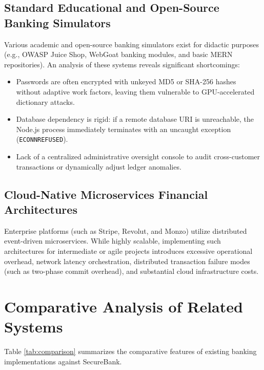 \subsection{Standard Educational and Open-Source Banking Simulators}
Various academic and open-source banking simulators exist for didactic purposes (e.g., OWASP Juice Shop, WebGoat banking modules, and basic MERN repositories). An analysis of these systems reveals significant shortcomings:
\begin{itemize}
    \item Passwords are often encrypted with unkeyed MD5 or SHA-256 hashes without adaptive work factors, leaving them vulnerable to GPU-accelerated dictionary attacks.
    \item Database dependency is rigid: if a remote database URI is unreachable, the Node.js process immediately terminates with an uncaught exception (\texttt{ECONNREFUSED}).
    \item Lack of a centralized administrative oversight console to audit cross-customer transactions or dynamically adjust ledger anomalies.
\end{itemize}

\subsection{Cloud-Native Microservices Financial Architectures}
Enterprise platforms (such as Stripe, Revolut, and Monzo) utilize distributed event-driven microservices. While highly scalable, implementing such architectures for intermediate or agile projects introduces excessive operational overhead, network latency orchestration, distributed transaction failure modes (such as two-phase commit overhead), and substantial cloud infrastructure costs.

\section{Comparative Analysis of Related Systems}
Table \ref{tab:comparison} summarizes the comparative features of existing banking implementations against SecureBank.

